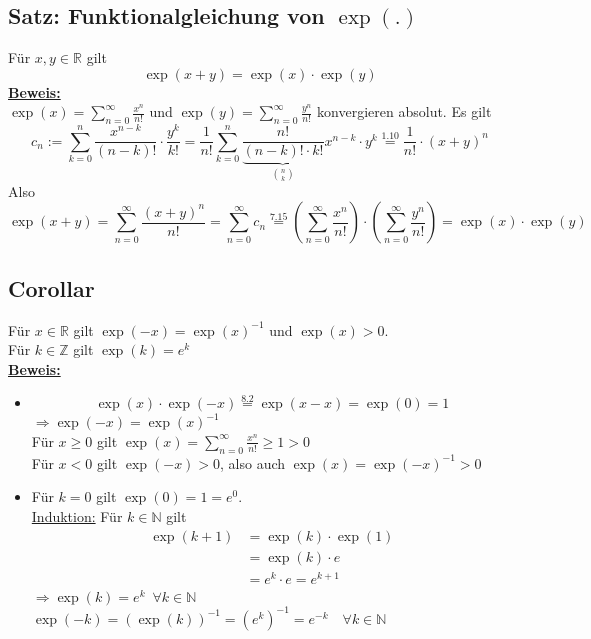 \subsection{Satz: Funktionalgleichung von $\exp (.)$} %
\label{sub:funktionalgleichung_von_exp_}
Für $x,y \in \mathds{R}$ gilt 
\[
	\exp(x+y)= \exp (x) \cdot \exp (y)
\]
\underline{\textbf{Beweis:}} \\
$\exp (x)= \sum\limits_{n=0}^{\infty} \frac{x^n}{n!}$ und $\exp (y)= \sum\limits_{n=0}^{\infty}  \frac{y^n}{n!}$ konvergieren
absolut. Es gilt
\[
	c_n := \sum\limits_{k=0}^{n} \frac{x^{n-k}}{(n-k)!} \cdot \frac{y^k}{k!} = \frac{1}{n!} \sum\limits_{k=0}^{n}
	\frac{n!}{\underbrace{(n-k)! \cdot k!}_{\binom{n}{k}}} x^{n-k} \cdot y^k \overset{1.10}{=} \frac{1}{n!} \cdot (x+y)^n
\]
Also
\[
	\exp (x+y) = \sum\limits_{n=0}^{\infty} \frac{(x+y)^n}{n!} = \sum\limits_{n=0}^{\infty} c_n \overset{7.15}{=}
	\left(\sum\limits_{n=0}^{\infty} \frac{x^n}{n!}\right) \cdot  \left( \sum\limits_{n=0}^{\infty} \frac{y^n}{n!}\right)
	= \exp (x) \cdot  \exp (y)
\]

\subsection{Corollar} %
\label{sub:corollar}
Für $x \in \mathds{R}$ gilt $\exp (-x)= \exp (x)^{-1}$ und $\exp (x)>0$. \\
Für $k \in \mathds{Z}$ gilt $\exp (k) = e^k$
\vspace{\baselineskip} \\
\underline{\textbf{Beweis:}} \\
\begin{itemize}
	\item 
	\[
	\exp (x) \cdot \exp (-x) \overset{8.2}{=} \exp (x-x) = \exp (0) = 1
	\]
	$\Rightarrow \exp (-x) = \exp (x)^{-1}$ \\
	Für $x \ge 0$ gilt $\exp (x)= \sum\limits_{n=0}^{\infty} \frac{x^n}{n!} \ge 1 >0$ \\
	Für $x < 0$ gilt $\exp (-x) >0$, also auch $\exp (x)= \exp (-x)^{-1} >0$
	\item Für $k=0$ gilt $\exp (0)= 1 = e^0.$ \\
	\underline{Induktion:} Für $k \in \mathds{N}$ gilt
	\begin{align*}
		\exp (k+1) &= \exp (k) \cdot \exp (1) \tag{folgt aus 8.2} \\
		&= \exp (k) \cdot e \\
		&= e^k \cdot e = e^{k+1}
	\end{align*}
	$\Rightarrow \exp (k) = e^k \enspace \forall k \in \mathds{N}$ \\
	$\exp (-k)= (\exp (k))^{-1} = (e^k)^{-1} = e^{-k} \quad \forall k \in \mathds{N}$
\end{itemize}

